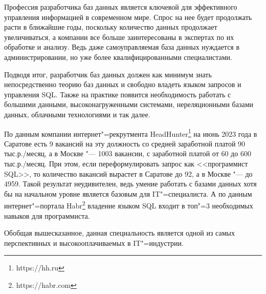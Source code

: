 Профессия разработчика баз данных является ключевой для эффективного управления информацией в современном мире. Спрос 
на нее будет продолжать расти в ближайшие годы, поскольку количество данных продолжает увеличиваться, а 
компании все больше заинтересованы в экспертах по их обработке и анализу. Ведь даже самоуправляемая база данных нуждается в администрировании, но уже более квалифицированными специалистами. 

Подводя итог, разработчик баз данных должен как минимум знать непосредственно теорию баз данных и свободно владеть языком запросов и управления SQL. Также на практике появится необходимость работать с большими данными, высоконагруженными системами, нереляционными базами данных, облачными технологиями и так далее.

По данным компании интернет"=рекрутмента HeadHunter\footnote{https://hh.ru} на июнь 2023 года в Саратове есть 9 вакансий на эту должность со средней заработной платой 90 тыс.р./месяц, а в Москве "--- 1003 вакансии, с заработной платой от 60 до 600 тыс.р./месяц. При этом, если переформулировать запрос как <<программист SQL>>, то количество вакансий вырастет в Саратове до 92, а в Москве "--- до 4959. Такой результат неудивителен, ведь умение работать с базами данных хотя бы на начальном уровне является базовым для IT"=специалиста. А по данным интернет"=портала Habr\footnote{https://habr.com} владение языком SQL входит в топ"=3 необходимых навыков для программиста.

Обобщая вышесказанное, данная специальность является одной из самых перспективных и высокооплачиваемых в IT"=индустрии.
